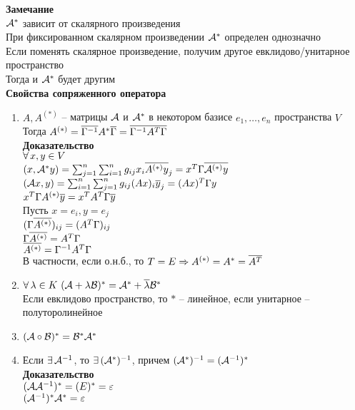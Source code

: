 \documentclass[12pt]{article}
\begin{document}
\textbf{Замечание}\\
$\mathcal{A}^*$ зависит от скалярного произведения\\
При фиксированном скалярном произведении $\mathcal{A}^*$ определен однозначно\\
Если поменять скалярное произведение, получим другое евклидово/унитарное пространство\\
Тогда и $\mathcal{A}^*$ будет другим\\
\textbf{Свойства сопряженного оператора}
\begin{enumerate}
    \item $A, A^{(*)}$ -- матрицы $\mathcal{A}$ и $\mathcal{A}^*$ в некотором базисе $e_1, \ldots, e_n$ пространства $V$\\
        Тогда $A^{(*)} = \overline {\Gamma^{-1}} A^* \overline \Gamma = \overline{\Gamma^{-1} A^T \Gamma}$\\
        \textbf{Доказательство}\\
        $\forall\, x, y \in V$\\
        $(x, \mathcal{A}^* y) = \sum_{j=1}^n \sum_{i=1}^n g_{ij} x_i \overline{A^{(*)} y}_j = x^T \Gamma \overline{\mathcal{A}^{(*)} y}$\\
        $(\mathcal{A} x, y) = \sum_{i=1}^n \sum_{j=1}^n g_{ij} (A x)_i \overline{y}_j = (A x)^T \Gamma y $\\
        $x^T \Gamma A^{(*)} \overline y = x^T A^T \Gamma \overline y $\\
        Пусть $x = e_i, y = e_j$\\
        $( \Gamma \overline{A^{(*)}})_{ij} = (A^T \Gamma)_{ij} $\\
        $ \Gamma \overline{A^{(*)}} = A^T \Gamma $\\
        $ \overline{A^{(*)}} = \Gamma^{-1}A^T \Gamma $\\
        В частности, если о.н.б., то $T = E \Rightarrow A^{(*)} = A^* = \overline{A^T} $
    \item $\forall\, \lambda \in K\ (\mathcal{A} + \lambda\mathcal{B})^* = \mathcal{A}^* + \overline \lambda \mathcal{B}^* $\\
        Если евклидово пространство, то $*$ -- линейное, если унитарное -- полуторолинейное
    \item $(\mathcal{A} \circ \mathcal{B})^* = \mathcal{B}^* \mathcal{A}^*$\\
    \item Если $\exists\, \mathcal{A}^{-1}$, то $\exists\, (\mathcal{A}^*)^{-1}$, причем $(\mathcal{A}^*)^{-1} = (\mathcal{A}^{-1})^* $\\
        \textbf{Доказательство}\\
        $(\mathcal{A} \mathcal{A}^{-1})^* = (E)^* = \varepsilon $\\
        $(\mathcal{A}^{-1})^* \mathcal{A}^* = \varepsilon $\\

\end{enumerate}
\end{document}
